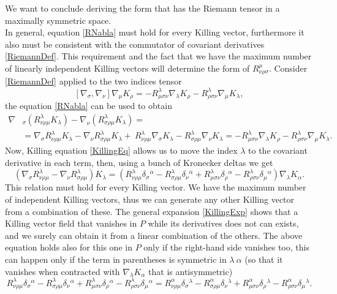We want to conclude deriving the form that has the Riemann tensor in a maximally symmetric space.\\
In general, equation \eqref{RNabla} must hold for every Killing vector, furthermore it also must be consistent with the commutator of covariant derivatives \eqref{RiemannDef}. This requirement and the fact that we have the maximum number of linearly independent Killing vectors will determine the form of $R^\mu_{\nu\rho\sigma}$. Consider \eqref{RiemannDef} applied to the two indices tensor $$ [\nabla_\sigma,\nabla_\nu]\nabla_\mu K_\rho=-R^\lambda_{\mu\sigma\nu}\nabla_\lambda K_\rho-R^\lambda _{\rho\sigma\nu}\nabla_\mu K_\lambda,$$ the equation \eqref{RNabla} can be used to obtain 
\begin{align*}
    \nabla&_\sigma(R^\lambda_{\nu\rho\mu}K_\lambda)-\nabla_\nu(R^\lambda_{\sigma\rho\mu}K_\lambda)=\\&=\nabla_\sigma R^\lambda_{\nu\rho\mu}K_\lambda-\nabla_\nu R^\lambda_{\sigma\rho\mu}K_\lambda+\ R^\lambda_{\nu\rho\mu}\nabla_\sigma K_\lambda- R^\lambda_{\sigma\rho\mu}\nabla_\nu K_\lambda=-R^\lambda_{\mu\sigma\nu}\nabla_\lambda K_\rho-R^\lambda _{\rho\sigma\nu}\nabla_\mu K_\lambda.
\end{align*}
Now, Killing equation \eqref{KillingEq} allows us to move the index $\lambda$ to the covariant derivative in each term, then, using a bunch of Kronecker deltas we get $$ (\nabla_\sigma R^\lambda_{\nu\rho\mu}-\nabla_\nu R^\lambda_{\sigma\rho\mu})K_\lambda=(R^\lambda_{\nu\rho\mu}\delta_{\sigma}\phantom{}^\alpha-R^\lambda_{\sigma\rho\mu}\delta_{\nu}\phantom{}^\alpha+R^\lambda_{\mu\sigma\nu}\delta_{\rho}\phantom{}^\alpha-R^\lambda_{\rho\sigma\nu}\delta_{\mu}\phantom{}^\alpha)\nabla_\lambda K_\alpha.$$
This relation must hold for every Killing vector. We have the maximum number of independent Killing vectors, thus we can generate any other Killing vector from a combination of these. The general expansion \eqref{KillingExp} shows that a Killing vector field that vanishes in $P$ while its derivatives does not can exists, and we surely can obtain it from a linear combination of the others. The above equation holds also for this one in $P$ only if the right-hand side vanishes too, this can happen only if the term in parentheses is symmetric in $\lambda\ \alpha$ (so that it vanishes when contracted with $\nabla_\lambda K_\alpha$ that is antisymmetric)$$R^\lambda_{\nu\rho\mu}\delta_{\sigma}\phantom{}^\alpha-R^\lambda_{\sigma\rho\mu}\delta_{\nu}\phantom{}^\alpha+R^\lambda_{\mu\sigma\nu}\delta_{\rho}\phantom{}^\alpha-R^\lambda_{\rho\sigma\nu}\delta_{\mu}\phantom{}^\alpha=R^\alpha_{\nu\rho\mu}\delta_{\sigma}\phantom{}^\lambda-R^\alpha_{\sigma\rho\mu}\delta_{\nu}\phantom{}^\lambda+R^\alpha_{\mu\sigma\nu}\delta_{\rho}\phantom{}^\lambda-R^\alpha_{\rho\sigma\nu}\delta_{\mu}\phantom{}^\lambda.$$
